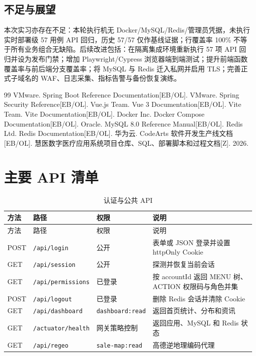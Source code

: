 \documentclass[UTF8,a4paper,12pt,openany,fontset=windows]{ctexrep}
\begin{document}
\section{不足与展望}
本次实习亦存在不足：本轮执行机无 Docker/MySQL/Redis/管理员凭据，未执行实时部署级 57 用例 API 回归，历史 57/57 仅作基线证据；行覆盖率 100\% 不等于所有业务组合无缺陷。后续改进包括：在隔离集成环境重新执行 57 项 API 回归并设为发布门禁；增加 Playwright/Cypress 浏览器端到端测试；提升前端函数覆盖率与前后端分支覆盖率；将 MySQL 与 Redis 迁入私网并启用 TLS；完善正式子域名的 WAF、日志采集、指标告警与备份恢复演练。

\begin{thebibliography}{99}
   VMware. Spring Boot Reference Documentation[EB/OL].
   VMware. Spring Security Reference[EB/OL].
   Vue.js Team. Vue 3 Documentation[EB/OL].
   Vite Team. Vite Documentation[EB/OL].
   Docker Inc. Docker Compose Documentation[EB/OL].
   Oracle. MySQL 8.0 Reference Manual[EB/OL].
   Redis Ltd. Redis Documentation[EB/OL].
   华为云. CodeArts 软件开发生产线文档[EB/OL].
   慧医数字医疗应用系统项目仓库、SQL、部署脚本和过程文档[Z]. 2026.
\end{thebibliography}

\appendix
\chapter{主要 API 清单}

\begin{longtable}{p{2.1cm}p{4.4cm}p{2.8cm}p{4.2cm}}
  \caption{认证与公共 API}\label{tab:public-api}\\
  \toprule
  方法 & 路径 & 权限 & 说明 \\
  \midrule
  \endfirsthead
  \toprule
  方法 & 路径 & 权限 & 说明 \\
  \midrule
  \endhead
  POST & \texttt{/api/login} & 公开 & 表单或 JSON 登录并设置 httpOnly Cookie \\
  GET & \texttt{/api/session} & 公开 & 探测并恢复当前会话 \\
  GET & \texttt{/api/permissions} & 已登录 & 按 accountId 返回 MENU 树、ACTION 权限码与角色并集 \\
  POST & \texttt{/api/logout} & 已登录 & 删除 Redis 会话并清除 Cookie \\
  GET & \texttt{/api/dashboard} & \texttt{dashboard:\allowbreak read} & 返回首页统计、分布和资讯 \\
  GET & \texttt{/actuator/health} & 网关策略控制 & 返回应用、MySQL 和 Redis 状态 \\
  GET & \texttt{/api/regeo} & \texttt{sale-map:\allowbreak read} & 高德逆地理编码代理 \\
  \bottomrule
\end{longtable}
\end{document}
